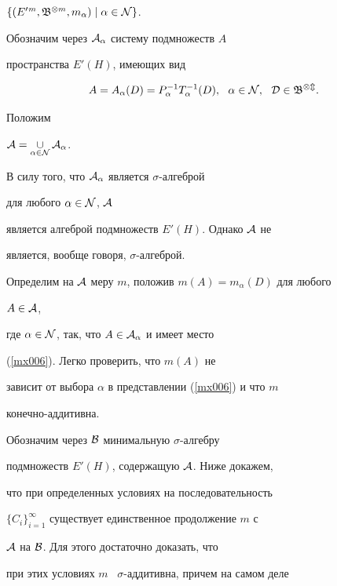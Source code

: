 $\{ (E'{}^m,\frak{B}^{\otimes m},m_{\alpha})\mid


\alpha\in\cal{N} \}$.





Обозначим через $\cal{A}_{\alpha}$ систему подмножеств $A$


пространства $E'(H)$, имеющих вид


\begin{equation}\label{mx006}


A=A_\alpha(D)=P_\alpha^{-1}T_\alpha^{-1}(D), \ \


\alpha\in\cal{N},\ \ D\in\frak{B}^{\otimes m}.


\end{equation}


Положим


$\cal{A}=\mathop{\cup}\limits_{\alpha\in\cal{N}}\cal{A}_\alpha$.


В силу того, что $\cal{A}_\alpha$ является $\sigma$-алгеброй


для любого $\alpha\in\cal{N}$, $\cal{A}$


является алгеброй подмножеств $E'(H)$. Однако $\cal{A}$ не


является, вообще говоря, $\sigma$-алгеброй.





Определим на $\cal{A}$ меру $m$, положив $m(A)=m_\alpha(D)$ для любого


$A\in\cal{A}$,


где $\alpha\in\cal{N}$, так, что $A\in\cal{A}_\alpha$ и имеет место


(\ref{mx006}). Легко проверить, что $m(A)$ не


зависит от выбора $\alpha$ в представлении (\ref{mx006}) и что $m$


конечно-аддитивна.





Обозначим через $\cal{B}$ минимальную $\sigma$-алгебру


подмножеств $E'(H)$, содержащую $\cal{A}$. Ниже докажем,


что при определенных условиях на последовательность


$\{C_i\}_{i=1}^{\infty}$ существует единственное продолжение $m$ с


$\cal{A}$ на $\cal{B}$. Для этого достаточно доказать, что


при этих условиях $m$ \ $\sigma$-аддитивна, причем на самом деле


